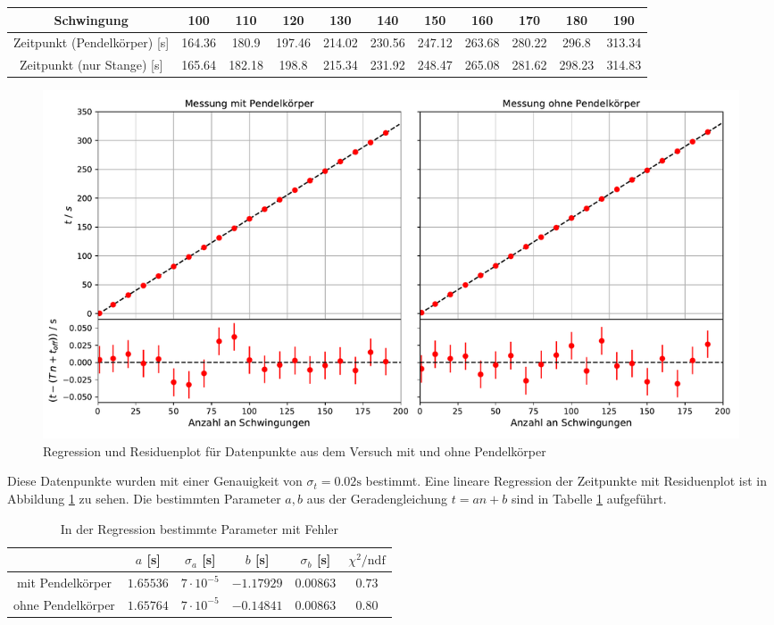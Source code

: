 \begin{table}[H]
\centering
\begin{adjustbox}{width=\textwidth}
\begin{tabular}{c|cccccccccc}
Schwingung & 100 & 110 & 120 & 130 & 140 & 150 & 160 & 170 & 180 & 190 \\
\hline
Zeitpunkt (Pendelkörper) [s] & 164.36 & 180.9 & 197.46 & 214.02 & 230.56 & 247.12 & 263.68 & 280.22 & 296.8 & 313.34 \\
Zeitpunkt (nur Stange) [s] & 165.64 & 182.18 & 198.8 & 215.34 & 231.92 & 248.47 & 265.08 & 281.62 & 298.23 & 314.83
\end{tabular}
\end{adjustbox}
\end{table}

\begin{figure}[h]
	\centering
	\includegraphics[width = \textwidth]{plots/regression.pdf}
	\caption{Regression und Residuenplot für Datenpunkte aus dem Versuch mit und ohne Pendelkörper}\label{plot:regression}
\end{figure}

Diese Datenpunkte wurden mit einer Genauigkeit von $\sigma_{t} = 0.02\text{s}$ bestimmt. Eine lineare Regression der Zeitpunkte mit Residuenplot ist in Abbildung \ref{plot:regression} zu sehen. Die bestimmten Parameter $a,b$ aus der Geradengleichung $t = an+b$ sind in Tabelle \ref{tab:reg} aufgeführt.

\begin{table}[H]
\centering
\begin{tabular}{c|ccccc}
& $a$ [s] & $\sigma_a$ [s] & $b$ [s] & $\sigma_b$ [s] & $\chi^2/\text{ndf}$ \\
\hline
mit Pendelkörper & $1.65536$ & $7\cdot 10^{-5}$ & $-1.17929$ & $0.00863$ & $0.73$ \\
ohne Pendelkörper & $1.65764$ & $7\cdot 10^{-5}$ & $-0.14841$ & $0.00863$ & $0.80$
\end{tabular}
\caption{In der Regression bestimmte Parameter mit Fehler}\label{tab:reg}
\end{table}


